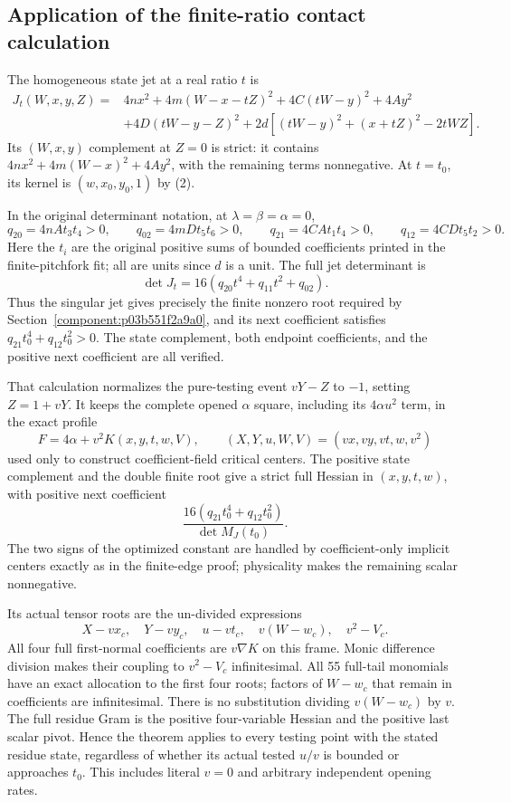 \subsection*{Application of the finite-ratio contact calculation}

The homogeneous state jet at a real ratio $t$ is
\begin{align*}
 J_t(W,x,y,Z)={}&4nx^2+4m(W-x-tZ)^2+4C(tW-y)^2+4Ay^2\\
 &+4D(tW-y-Z)^2
   +2d[(tW-y)^2+(x+tZ)^2-2tWZ].
\end{align*}
Its $(W,x,y)$ complement at $Z=0$ is strict: it contains
$4nx^2+4m(W-x)^2+4Ay^2$, with the remaining terms nonnegative.
At $t=t_0$, its kernel is $(w,x_0,y_0,1)$ by (2).

In the original determinant notation, at $\lambda=\beta=\alpha=0$,
\[
 q_{20}=4nAt_3t_4>0,\qquad q_{02}=4mDt_5t_6>0,
 \qquad q_{21}=4CAt_1t_4>0,\qquad q_{12}=4CDt_5t_2>0.
\]
Here the $t_i$ are the original positive sums of bounded coefficients
printed in the finite-pitchfork fit; all are units since $d$ is a
unit. The full jet determinant is
\[
 \det J_t=16(q_{20}t^4+q_{11}t^2+q_{02}).
\]
Thus the singular jet gives precisely the finite nonzero root required
by Section~\ref{component:p03b551f2a9a0}, and its next coefficient satisfies
$q_{21}t_0^4+q_{12}t_0^2>0$. The state complement, both endpoint
coefficients, and the positive next coefficient are all verified.

That calculation normalizes the pure-testing event
$vY-Z$ to $-1$, setting $Z=1+vY$. It keeps the complete opened
$\alpha$ square, including its $4\alpha u^2$ term, in the exact
profile
\[
 F=4\alpha+v^2K(x,y,t,w,V),\qquad
 (X,Y,u,W,V)=(vx,vy,vt,w,v^2)
\]
used only to construct coefficient-field critical centers. The positive
state complement and the double finite root give a strict full Hessian
in $(x,y,t,w)$, with positive next coefficient
\[
 \frac{16(q_{21}t_0^4+q_{12}t_0^2)}{\det M_J(t_0)}.
\]
The two signs of the optimized constant are handled by coefficient-only
implicit centers exactly as in the finite-edge proof; physicality makes
the remaining scalar nonnegative.

Its actual tensor roots are the un-divided expressions
\[
 X-vx_c,\quad Y-vy_c,\quad u-vt_c,\quad v(W-w_c),
 \quad v^2-V_c.
\]
All four full first-normal coefficients are $v\nabla K$ on this
frame. Monic difference division makes their coupling to $v^2-V_c$
infinitesimal. All 55 full-tail monomials have an exact allocation to
the first four roots; factors of $W-w_c$ that remain in coefficients
are infinitesimal. There is no substitution dividing $v(W-w_c)$ by
$v$. The full residue Gram is the positive four-variable Hessian and
the positive last scalar pivot. Hence the theorem applies to every
testing point with the stated residue state, regardless of whether its
actual tested $u/v$ is bounded or approaches $t_0$. This includes literal
$v=0$ and arbitrary independent opening rates.

